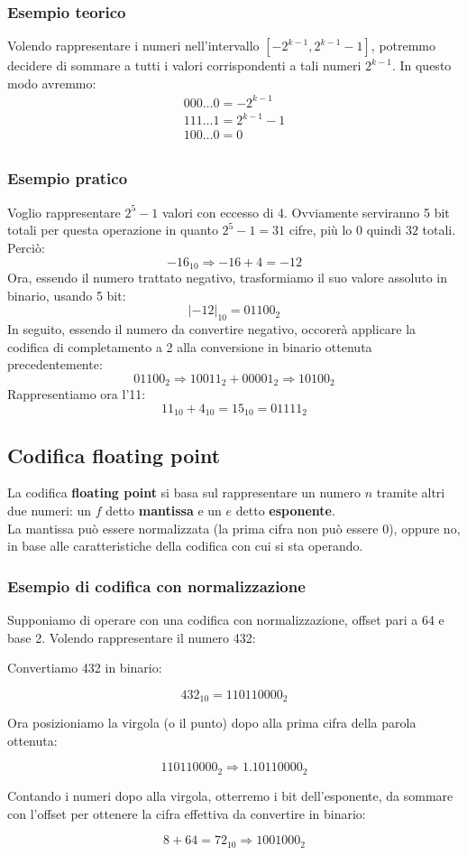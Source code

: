 \documentclass[12pt]{article}
\begin{document}
\subsubsection{Esempio teorico}
Volendo rappresentare i numeri nell'intervallo $[-2^{k-1}, 2^{k-1}-1]$, potremmo decidere di sommare a tutti i valori corrispondenti a tali numeri $2^{k-1}$. In questo modo avremmo:
\begin{gather*}
    000 \dots 0 = -2^{k-1}\\
    111 \dots 1 = 2^{k-1}-1\\
    100 \dots 0 = 0\\
\end{gather*}
\subsubsection{Esempio pratico}
Voglio rappresentare $2^5-1$ valori con eccesso di 4. Ovviamente serviranno 5 bit totali per questa operazione in quanto $2^5-1 = 31$ cifre, più lo $0$ quindi $32$ totali. Perciò:
\[ -16_{10} \Rightarrow -16 + 4 = -12 \]
Ora, essendo il numero trattato negativo, trasformiamo il suo valore assoluto in binario, usando 5 bit:
\[ |-12|_{10} = 01100_2 \]
In seguito, essendo il numero da convertire negativo, occorerà applicare la codifica di completamento a 2 alla conversione in binario ottenuta precedentemente:
\[ 01100_2 \Rightarrow 10011_2 + 00001_2 \Rightarrow 10100_2 \]
Rappresentiamo ora l'11:
\[11_{10} + 4_{10} = 15_{10} = 01111_2\]
\subsection{Codifica floating point}
La codifica \textbf{floating point} si basa sul rappresentare un numero $n$ tramite altri due numeri: un $f$ detto \textbf{mantissa} e un $e$ detto \textbf{esponente}.\\
La mantissa può essere normalizzata (la prima cifra non può essere $0$), oppure no, in base alle caratteristiche della codifica con cui si sta operando.
\subsubsection{Esempio di codifica con normalizzazione}
Supponiamo di operare con una codifica con normalizzazione, offset pari a 64 e base 2. Volendo rappresentare il numero 432:
\begin{center}
    Convertiamo 432 in binario:
\end{center}
\[432_{10} = 110110000_2\]
\begin{center}
    Ora posizioniamo la virgola (o il punto) dopo alla prima cifra della parola ottenuta:
\end{center}
\[110110000_2 \Rightarrow 1.10110000_2\]
\begin{center}
    Contando i numeri dopo alla virgola, otterremo i bit dell'esponente, da sommare con l'offset per ottenere la cifra effettiva da convertire in binario:
\end{center}
\[8 + 64 = 72_{10} \Rightarrow 1001000_2\]
\end{document}
